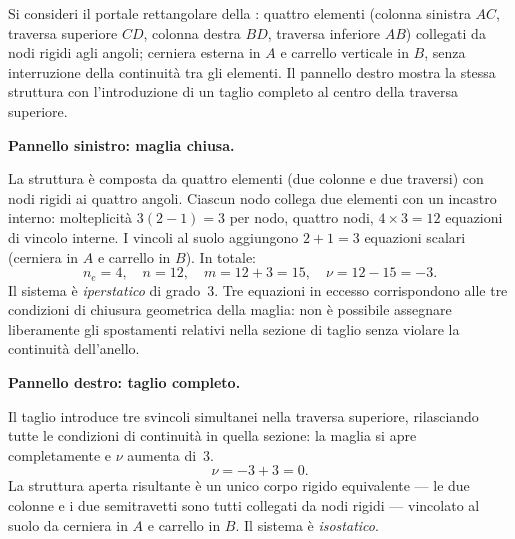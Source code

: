 

\begin{esempio}
	\label{ex:portale_biconnesso}
	Si consideri il portale rettangolare della
	: quattro elementi
	(colonna sinistra $AC$, traversa superiore $CD$,
	colonna destra $BD$, traversa inferiore $AB$)
	collegati da nodi rigidi agli angoli; cerniera
	esterna in $A$ e carrello verticale in $B$, senza
	interruzione della continuità tra gli elementi.
	Il pannello destro mostra la stessa struttura con
	l'introduzione di un taglio completo al centro
	della traversa superiore.
	


	
	\textbf{Pannello sinistro: maglia chiusa.}
	\begin{svolgimento}
		La struttura è composta da quattro elementi (due
		colonne e due traversi) con nodi rigidi ai quattro
		angoli. Ciascun nodo collega due elementi con
		un incastro interno: molteplicità $3(2-1) = 3$
		per nodo, quattro nodi, $4 \times 3 = 12$ equazioni
		di vincolo interne. I vincoli al suolo aggiungono
		$2 + 1 = 3$ equazioni scalari (cerniera in $A$
		e carrello in $B$). In totale:
		\[
		n_e = 4,\quad n = 12,\quad m = 12 + 3 = 15,
		\quad \nu = 12 - 15 = -3.
		\]
		Il sistema è \textit{iperstatico} di grado~3.
		Tre equazioni in eccesso corrispondono alle tre
		condizioni di chiusura geometrica della maglia:
		non è possibile assegnare liberamente gli
		spostamenti relativi nella sezione di taglio
		senza violare la continuità dell'anello.
	\end{svolgimento}
	
	\textbf{Pannello destro: taglio completo.}
	\begin{svolgimento}
		Il taglio introduce tre svincoli simultanei nella
		traversa superiore, rilasciando tutte le condizioni
		di continuità in quella sezione: la maglia si apre
		completamente e $\nu$ aumenta di~3.
		\[
		\nu = -3 + 3 = 0.
		\]
		La struttura aperta risultante è un unico corpo
		rigido equivalente --- le due colonne e i due
		semitravetti sono tutti collegati da nodi rigidi
		--- vincolato al suolo da cerniera in $A$ e
		carrello in $B$. Il sistema è \textit{isostatico}.
	\end{svolgimento}
\end{esempio}



